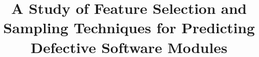 \documentclass{elsart}
\begin{document}
\begin{frontmatter}



\title{A Study of Feature Selection and Sampling Techniques for Predicting Defective Software Modules}


%








\begin{abstract}




\end{abstract}
\end{frontmatter}
\end{document}
